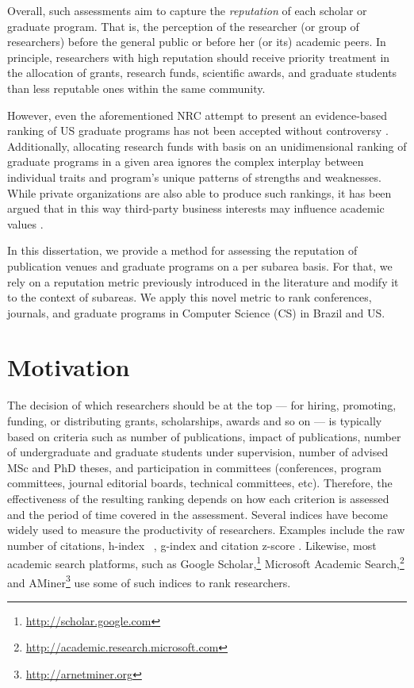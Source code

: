 \documentclass[msc]{ppgccufmg}
\begin{document}
Overall, such assessments aim to capture the \textit{reputation} of each scholar or graduate program. That is, the perception of the researcher (or group of researchers) before the general public or before her (or its) academic peers. In principle, researchers with high reputation should receive priority treatment in the allocation of grants, research funds, scientific awards, and graduate students than less reputable ones within the same community.

However, even the aforementioned NRC attempt to present an evidence-based ranking of US graduate programs has not been accepted without controversy \citep{vardi17}. Additionally, allocating research funds with basis on an unidimensional ranking of graduate programs in a given area ignores the complex interplay between individual traits and program's unique patterns of strengths and weaknesses. While private organizations are also able to produce such rankings, it has been argued that in this way third-party business interests may influence academic values \citep{brembs13}.

In this dissertation, we provide a method for assessing the reputation of publication venues and graduate programs on a per subarea basis. For that, we rely on a reputation metric previously introduced in the literature \citep{ribas2015random} and modify it to the context of subareas. We apply this novel metric to rank conferences, journals, and graduate programs in Computer Science (CS) in Brazil and US.

\section{Motivation}

The decision of which researchers should be at the top --- for hiring, promoting, funding, or distributing grants, scholarships, awards and so on --- is typically based on criteria such as number of publications, impact of publications, number of undergraduate and graduate students under supervision, number of advised MSc and PhD theses, and participation in committees (conferences, program committees, journal editorial boards, technical committees, etc). 
%
Therefore, the effectiveness of the resulting ranking depends on how each criterion is assessed and the period of time covered in the assessment. Several indices have become widely used to measure the productivity of researchers. Examples include the raw number of citations, h-index ~\citep{hirsch2005}, g-index \citep{egghe2006theory} and citation z-score \citep{zscore}. Likewise, most academic search platforms, such as Google Scholar,\footnote{\url{http://scholar.google.com}} Microsoft Academic Search,\footnote{\url{http://academic.research.microsoft.com}} and AMiner\footnote{\url{http://arnetminer.org}} use some of such indices to rank researchers.
\end{document}
